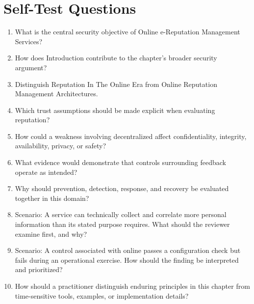 \documentclass[11pt]{article}
\begin{document}
\section*{Self-Test Questions}
\begin{enumerate}
\item What is the central security objective of Online e-Reputation Management Services?
\item How does Introduction contribute to the chapter's broader security argument?
\item Distinguish Reputation In The Online Era from Online Reputation Management Architectures.
\item Which trust assumptions should be made explicit when evaluating reputation?
\item How could a weakness involving decentralized affect confidentiality, integrity, availability, privacy, or safety?
\item What evidence would demonstrate that controls surrounding feedback operate as intended?
\item Why should prevention, detection, response, and recovery be evaluated together in this domain?
\item Scenario: A service can technically collect and correlate more personal information than its stated purpose requires. What should the reviewer examine first, and why?
\item Scenario: A control associated with online passes a configuration check but fails during an operational exercise. How should the finding be interpreted and prioritized?
\item How should a practitioner distinguish enduring principles in this chapter from time-sensitive tools, examples, or implementation details?
\end{enumerate}
\end{document}
